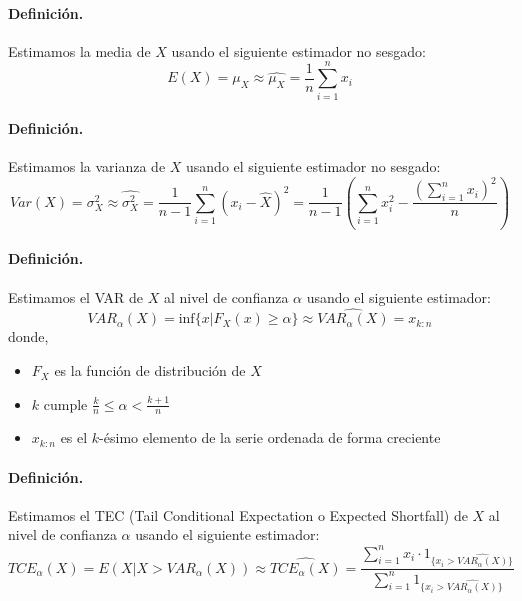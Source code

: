 \paragraph{Definici\'on.} Estimamos la media de $X$ usando el siguiente
estimador no sesgado:
\begin{displaymath}
E(X) = \mu_X  \approx \widehat{\mu_X} = \frac{1}{n} \sum_{i=1}^{n} x_i
\end{displaymath}

\paragraph{Definici\'on.} Estimamos la varianza de $X$ usando el siguiente
estimador no sesgado:
\begin{displaymath}
Var(X) = \sigma_{X}^{2} \approx \widehat{\sigma_{X}^{2}} =
\frac{1}{n-1} \sum_{i=1}^{n} (x_i - \widehat{X})^2 =
\frac{1}{n-1} \left( \sum_{i=1}^{n} x_i^2 - \frac{\left(\sum_{i=1}^{n} x_i \right)^2}{n} \right)
\end{displaymath}

\paragraph{Definici\'on.} Estimamos el VAR de $X$ al nivel de confianza $\alpha$
usando el siguiente estimador:
\begin{displaymath}
VAR_{\alpha}(X) = \textrm{inf}\{x | F_X(x) \geq \alpha \} \approx \widehat{VAR_{\alpha}(X)} = x_{k:n}
\end{displaymath}
donde,
\begin{itemize}
\item $F_X$ es la funci\'on de distribuci\'on de $X$
\item $k$ cumple $\frac{k}{n} \leq \alpha < \frac{k+1}{n}$
\item $x_{k:n}$ es el $k$-\'esimo elemento de la serie ordenada de forma creciente
\end{itemize}

\paragraph{Definici\'on.} Estimamos el TEC (Tail Conditional Expectation o Expected Shortfall)
de $X$ al nivel de confianza $\alpha$ usando el siguiente estimador:
\begin{displaymath}
TCE_{\alpha}(X) = E(X | X > VAR_{\alpha}(X)) \approx \widehat{TCE_{\alpha}(X)} =
\frac{\sum_{i=1}^{n} x_i \cdot \textrm{1}_{\{x_i >  \widehat{VAR_{\alpha}(X)}\}}}{\sum_{i=1}^{n} \textrm{1}_{\{x_i >  \widehat{VAR_{\alpha}(X)}\}}}
\end{displaymath}

